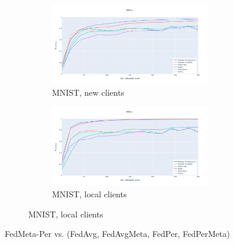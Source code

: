 \documentclass[oneside,a4paper,14pt]{extreport}
\begin{document}
\begin{figure}
    \begin{subfigure}{\textwidth}
        \centering
        \begin{subfigure}{.5\textwidth}
            \centering
            \includegraphics[width=\linewidth]{./tab_img/mnist_per_new.png}
            \caption{MNIST, new clients}
            \label{fig:mnist_per_new}
        \end{subfigure}%
        \begin{subfigure}{.5\textwidth}
            \centering
            \includegraphics[width=\linewidth]{./tab_img/mnist_per_old.png}
            \caption{MNIST, local clients}
            \label{fig:mnist_per_old}
        \end{subfigure}
    \end{subfigure}
    \caption*{FedMeta-Per vs. (FedAvg, FedAvgMeta, FedPer, FedPerMeta)}
    \label{fig:fedper_acc}
\end{figure}
\end{document}
